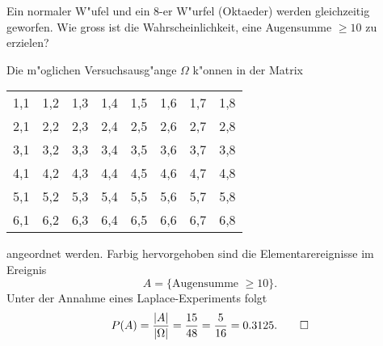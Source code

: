 Ein normaler W"ufel und ein 8-er W"urfel (Oktaeder) werden gleichzeitig
geworfen. 
Wie gross ist die Wahrscheinlichkeit, eine Augensumme $\ge 10$ zu erzielen?

\begin{loesung}
Die m"oglichen Versuchsausg"ange $\Omega$ k"onnen in der Matrix
\begin{center}
\begin{tabular}{|cccccccc|}
\hline
1,1&1,2&1,3&1,4&1,5&1,6&1,7&1,8\\
2,1&2,2&2,3&2,4&2,5&2,6&2,7&\color{red}2,8\\
3,1&3,2&3,3&3,4&3,5&3,6&\color{red}3,7&\color{red}3,8\\
4,1&4,2&4,3&4,4&4,5&\color{red}4,6&\color{red}4,7&\color{red}4,8\\
5,1&5,2&5,3&5,4&\color{red}5,5&\color{red}5,6&\color{red}5,7&\color{red}5,8\\
6,1&6,2&6,3&\color{red}6,4&\color{red}6,5&\color{red}6,6&\color{red}6,7&\color{red}6,8\\
\hline
\end{tabular}
\end{center}
angeordnet werden.
Farbig hervorgehoben sind die Elementarereignisse im Ereignis
\[
A=\{\text{Augensumme $\ge 10$}\}.
\]
Unter der Annahme eines Laplace-Experiments folgt
\[
P(A)=\frac{|A|}{|\Omega|}=\frac{15}{48}=\frac{5}{16}=0.3125.
\qedhere
\]
\end{loesung}

